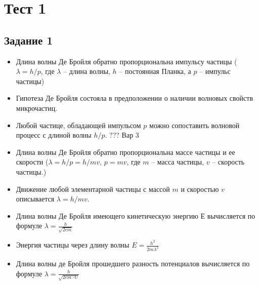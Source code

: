 \documentclass[../main.tex]{subfiles}
\begin{document}
\section{Тест 1}

\subsection{Задание 1}
\begin{itemize}
    \item Длина волны Де Бройля обратно пропорциональна импульсу частицы ($\lambda = h/p$, где $\lambda$ -- длина волны, $h$ -- постоянная Планка, а $p$ -- импульс частицы)
    \item Гипотеза Де Бройля состояла в предположении о наличии волновых свойств микрочастиц.
    \item Любой частице, обладающей импульсом $p$ можно сопоставить волновой процесс с длиной волны $h/p$. ??? Вар 3
    \item Длина волны Де Бройля обратно пропорциональна массе частицы и ее скорости ($\lambda = h/p = h/mv$, $p = mv$, где $m$ -- масса частицы, $v$ -- скорость частицы.)
    \item Движение любой элементарной частицы с массой $m$ и скоростью $v$ описывается $\lambda = h/mv$.
    \item Длина волны Де Бройля имеющего кинетическую энергию Е вычисляется по формуле $\lambda = \frac{h}{\sqrt{2 \epsilon m}}$
    \item Энергия частицы через длину волны $E = \frac{h^2}{2m \lambda^2}$
    \item Длина волны де Бройля прошедшего разность потенциалов вычисляется по формуле $\lambda = \frac{h}{\sqrt{2 \epsilon m \cdot U}}$
\end{itemize}
\end{document}
